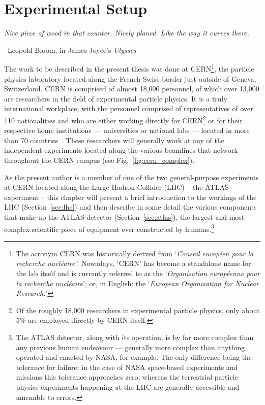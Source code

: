 \chapter{Experimental Setup}

	

\epigraph{\textit{Nice piece of wood in that counter. Nicely planed. Like the way it curves there.}}{--Leopold Bloom, in James Joyce's \textit{Ulysses}}

The work to be described in the present thesis was done at CERN\footnote{
The acronym CERN was historically derived from `\textit{Conseil europ{\'e}en pour la recherche
nucl{\'e}aire'}. Nowadays, `CERN' has become a standalone name for the lab itself and
is currently referred to as the `\textit{Organisation europ{\'e}enne pour la recherche nucl{\'e}aire}'; or, in English: the
`\textit{European Organisation for Nuclear Research.}'}, the particle
physics laboratory located along the French-Swiss border just outside of Geneva, Switzerland.
CERN is comprised of almost 18,000 personnel, of which over 13,000 are researchers in the
field of experimental particle physics.
It is a truly international workplace, with the personnel comprised of representatives of over 110 nationalities
and who are either working directly
for CERN\footnote{Of the roughly 18,000 researchers in experimental particle physics, only about
5\% are employed directly by CERN itself.} or for their respective home institutions
--- universities or national labs ---
located in more than 70 countries~\cite{CERN-HR-STAFF-STAT-2018}.
These researchers will generally work at any of the independent experiments located along the various
beamlines that network throughout the CERN campus (see Fig.~\ref{fig:cern_complex}).

As the present author is a member of one of the two general-purpose experiments at CERN located
along the Large Hadron Collider (LHC) -- the ATLAS experiment -- this chapter will present a
brief introduction to the workings of the LHC (Section~\ref{sec:lhc}) and then describe in some
detail the various components that make up the ATLAS detector (Section~\ref{sec:atlas}), the largest
and most complex scientific piece of equipment ever 
constructed by humans.\footnote{The ATLAS detector, along with its operation, is by far more complex
than any previous human endeavour --- generally more complex than anything operated and enacted by NASA, for
example. The only difference being the tolerance for failure: in the case of NASA space-based experiments and missions
this tolerance approaches zero, whereas the terrestrial particle physics experiments happening at the
LHC are generally accessible and amenable to errors.}



